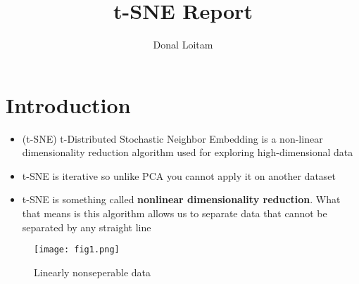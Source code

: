 \documentclass[a4paper, 11pt]{article}
\title{t-SNE Report}
\author{Donal Loitam}
\begin{document}
\maketitle
\tableofcontents

\section{Introduction}
\begin{itemize}
    \item (t-SNE) t-Distributed Stochastic Neighbor Embedding is a non-linear dimensionality reduction algorithm used for exploring high-dimensional data
    \item t-SNE is iterative so unlike PCA you cannot apply it on another dataset
    \item t-SNE is something called \textbf{nonlinear dimensionality reduction}. What that means is this algorithm allows us to separate data that cannot be separated by any straight line
\end{itemize}
\begin{figure}[h!]
    \texttt{[image: fig1.png]}
    \caption{Linearly nonseperable data}
    \label{fig:fig1}
  \end{figure}
\end{document}
